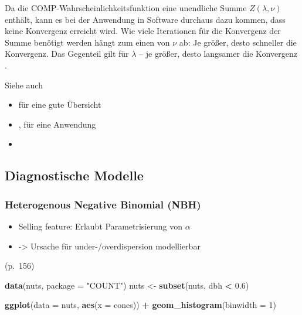 \documentclass[ngerman,a4paper,]{scrartcl}
\newenvironment{Shaded}{\begin{snugshade}}{\end{snugshade}}
\newcommand{\DataTypeTok}[1]{\textcolor[rgb]{0.13,0.29,0.53}{#1}}
\newcommand{\DecValTok}[1]{\textcolor[rgb]{0.00,0.00,0.81}{#1}}
\newcommand{\FloatTok}[1]{\textcolor[rgb]{0.00,0.00,0.81}{#1}}
\newcommand{\KeywordTok}[1]{\textcolor[rgb]{0.13,0.29,0.53}{\textbf{#1}}}
\newcommand{\NormalTok}[1]{#1}
\newcommand{\OperatorTok}[1]{\textcolor[rgb]{0.81,0.36,0.00}{\textbf{#1}}}
\newcommand{\StringTok}[1]{\textcolor[rgb]{0.31,0.60,0.02}{#1}}
\providecommand{\tightlist}{%
  \setlength{\itemsep}{0pt}\setlength{\parskip}{0pt}}
\theoremstyle{definition}
\theoremstyle{definition}
\theoremstyle{definition}
\theoremstyle{remark}
\begin{document}
Da die COMP-Wahrscheinlichkeitsfunktion eine unendliche Summe \(Z(\lambda, \nu)\) enthält, kann es bei der Anwendung in Software durchaus dazu kommen, dass keine Konvergenz erreicht wird. Wie viele Iterationen für die Konvergenz der Summe benötigt werden hängt zum einen von \(\nu\) ab: Je größer, desto schneller die Konvergenz. Das Gegenteil gilt für \(\lambda\) -- je größer, desto langsamer die Konvergenz \citep[p.~4]{high2018AlternativeVariance}.

Siehe auch

\begin{itemize}
\tightlist
\item
  \citet{sellers2010FlexibleRegression} für eine gute Übersicht
\item
  \citet{lord2010ExtensionApplication}, \citet{lord2008ApplicationConwayMaxwellPoisson} für eine Anwendung
\item
  \citet{shmueli2005UsefulDistribution}
\end{itemize}

\hypertarget{diagnostische-modelle}{%
\subsection{Diagnostische Modelle}\label{diagnostische-modelle}}

\hypertarget{mod-nbh}{%
\subsubsection{Heterogenous Negative Binomial (NBH)}\label{mod-nbh}}

\begin{itemize}
\tightlist
\item
  Selling feature: Erlaubt Parametrisierung von \(\alpha\)
\item
  -\textgreater{} Ursache für under-/overdispersion modellierbar
\end{itemize}

\citet{hilbeModelingCountData2014} (p.~156)

\begin{Shaded}
\begin{Highlighting}[]
\KeywordTok{data}\NormalTok{(nuts, }\DataTypeTok{package =} \StringTok{"COUNT"}\NormalTok{)}
\NormalTok{nuts <-}\StringTok{ }\KeywordTok{subset}\NormalTok{(nuts, dbh }\OperatorTok{<}\StringTok{ }\FloatTok{0.6}\NormalTok{)}

\KeywordTok{ggplot}\NormalTok{(}\DataTypeTok{data =}\NormalTok{ nuts, }\KeywordTok{aes}\NormalTok{(}\DataTypeTok{x =}\NormalTok{ cones)) }\OperatorTok{+}
\StringTok{  }\KeywordTok{geom_histogram}\NormalTok{(}\DataTypeTok{binwidth =} \DecValTok{1}\NormalTok{)}
\end{Highlighting}
\end{Shaded}
\end{document}
